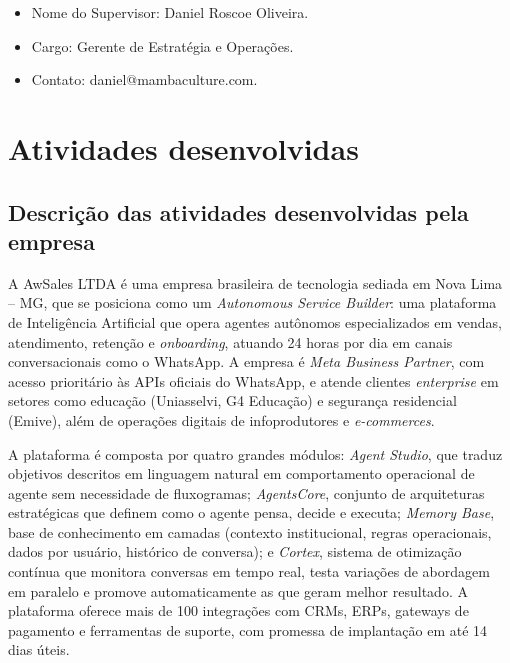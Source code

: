\documentclass[12pt,a4paper,oneside]{article}
\begin{document}
\begin{itemize}[leftmargin=2em,topsep=0pt]
  \item Nome do Supervisor: Daniel Roscoe Oliveira.
  \item Cargo: Gerente de Estratégia e Operações.
  \item Contato: daniel@mambaculture.com.
\end{itemize}

\section{Atividades desenvolvidas}

\subsection{Descrição das atividades desenvolvidas pela empresa}

A AwSales LTDA é uma empresa brasileira de tecnologia sediada em Nova Lima -- MG, que se posiciona como um \textit{Autonomous Service Builder}: uma plataforma de Inteligência Artificial que opera agentes autônomos especializados em vendas, atendimento, retenção e \textit{onboarding}, atuando 24 horas por dia em canais conversacionais como o WhatsApp. A empresa é \textit{Meta Business Partner}, com acesso prioritário às APIs oficiais do WhatsApp, e atende clientes \textit{enterprise} em setores como educação (Uniasselvi, G4 Educação) e segurança residencial (Emive), além de operações digitais de infoprodutores e \textit{e-commerces}.

A plataforma é composta por quatro grandes módulos: \textit{Agent Studio}, que traduz objetivos descritos em linguagem natural em comportamento operacional de agente sem necessidade de fluxogramas; \textit{AgentsCore}, conjunto de arquiteturas estratégicas que definem como o agente pensa, decide e executa; \textit{Memory Base}, base de conhecimento em camadas (contexto institucional, regras operacionais, dados por usuário, histórico de conversa); e \textit{Cortex}, sistema de otimização contínua que monitora conversas em tempo real, testa variações de abordagem em paralelo e promove automaticamente as que geram melhor resultado. A plataforma oferece mais de 100 integrações com CRMs, ERPs, gateways de pagamento e ferramentas de suporte, com promessa de implantação em até 14 dias úteis.
\end{document}
